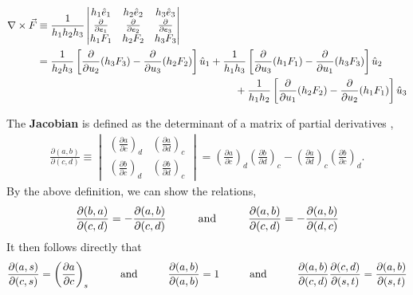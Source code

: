 \begin{align}
	\nabla \times \vec{F} &\equiv \frac{1}{h_1h_2h_3}
	\begin{vmatrix}
		h_1\hat{e}_1 & h_2\hat{e}_2 & h_3\hat{e}_3  \\ 
		\frac{\partial}{\partial e_1} & \frac{\partial}{\partial e_2} & \frac{\partial}{\partial e_3}  \\ 
		h_1F_1 & h_2F_2 & h_3F_3  
	\end{vmatrix} \\
	&= \frac{1}{h_2h_3}\left[\frac{\partial}{\partial u_2}(h_3F_3)-\frac{\partial}{\partial u_3}(h_2F_2)\right]\hat{u}_1+\frac{1}{h_1h_3}\left[\frac{\partial}{\partial u_3}(h_1F_1)-\frac{\partial}{\partial u_1}(h_3F_3)\right]\hat{u}_2 \nonumber\\
	&\hspace{6.72cm}+\frac{1}{h_1h_2}\left[\frac{\partial}{\partial u_1}(h_2F_2)-\frac{\partial}{\partial u_2}(h_1F_1)\right]\hat{u}_3
\end{align} 

The \textbf{Jacobian} is defined as the determinant of a matrix of partial derivatives \cite{bib:StellarAstrophysics},
\begin{align}
	\frac{\partial(a,b)}{\partial(c,d)} \equiv \begin{vmatrix}
		\left(\frac{\partial a}{\partial c}\right)_d & \left(\frac{\partial a}{\partial d}\right)_c \\
		\left(\frac{\partial b}{\partial c}\right)_d & \left(\frac{\partial b}{\partial d}\right)_c
	\end{vmatrix} =\left(\frac{\partial a}{\partial c}\right)_d\left(\frac{\partial b}{\partial d}\right)_c - \left(\frac{\partial a}{\partial d}\right)_c\left(\frac{\partial b}{\partial c}\right)_d.
\end{align}
By the above definition, we can show the relations,
\begin{align}
	\frac{\partial(b,a)}{\partial(c,d)}=-\frac{\partial(a,b)}{\partial(c,d)} \andspace{1cm} \frac{\partial(a,b)}{\partial(c,d)}=-\frac{\partial(a,b)}{\partial(d,c)} 
\end{align}
It then follows directly that
\begin{align}
	\frac{\partial(a,s)}{\partial(c,s)} = \left(\frac{\partial a}{\partial c}\right)_s \andspace{1cm} \frac{\partial(a,b)}{\partial(a,b)} = 1 \andspace{1cm} \frac{\partial(a,b)}{\partial(c,d)}\frac{\partial(c,d)}{\partial(s,t)} = \frac{\partial(a,b)}{\partial(s,t)}
\end{align}